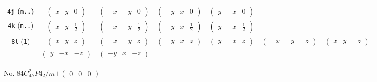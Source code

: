 \documentclass[fleqn,9pt,landscape]{jsarticle}
\begin{document}
\begin{center}
\begin{longtable}{ccccccc}
{\tt 4j} ({\tt m..}) & $ \begin{pmatrix} x & y & 0 \end{pmatrix} $ & $ \begin{pmatrix} - x & - y & 0 \end{pmatrix} $ & $ \begin{pmatrix} - y & x & 0 \end{pmatrix} $ & $ \begin{pmatrix} y & - x & 0 \end{pmatrix} $ & $  $ & $  $ \\ \hline
{\tt 4k} ({\tt m..}) & $ \begin{pmatrix} x & y & \frac{1}{2} \end{pmatrix} $ & $ \begin{pmatrix} - x & - y & \frac{1}{2} \end{pmatrix} $ & $ \begin{pmatrix} - y & x & \frac{1}{2} \end{pmatrix} $ & $ \begin{pmatrix} y & - x & \frac{1}{2} \end{pmatrix} $ & $  $ & $  $ \\ \hline
{\tt 8l} ({\tt 1}) & $ \begin{pmatrix} x & y & z \end{pmatrix} $ & $ \begin{pmatrix} - x & - y & z \end{pmatrix} $ & $ \begin{pmatrix} - y & x & z \end{pmatrix} $ & $ \begin{pmatrix} y & - x & z \end{pmatrix} $ & $ \begin{pmatrix} - x & - y & - z \end{pmatrix} $ & $ \begin{pmatrix} x & y & - z \end{pmatrix} $ \\
& $ \begin{pmatrix} y & - x & - z \end{pmatrix} $ & $ \begin{pmatrix} - y & x & - z \end{pmatrix} $ & $  $ & $  $ & $  $ & $  $ \\
\end{longtable}
\end{center}
\newpage
No. 84\quad$C_{4h}^{2}$\quad$P4_2/m$\quad[ tetragonal ]\quad$+\begin{pmatrix} 0 & 0 & 0 \end{pmatrix}$
\end{document}
